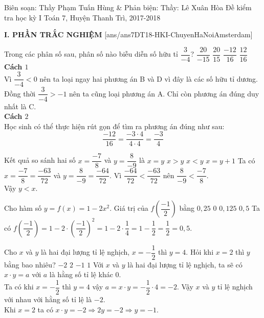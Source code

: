 	\begin{name}
		{Biên soạn: Thầy Phạm Tuấn Hùng \& Phản biện: Thầy: Lê Xuân Hòa}
		{Đề kiểm tra học kỳ I Toán 7, Huyện Thanh Trì, 2017-2018}
	\end{name}
	\noindent\textbf{I. PHẦN TRẮC NGHIỆM}
	\setcounter{ex}{0}
	[ans/ans7DT18-HKI-ChuyenHaNoiAmsterdam]
			\begin{ex}%
				Trong các phân số sau, phân số nào biễu diễn số hữu tỉ $\dfrac{3}{-4}$?
				\choice
				{$\dfrac{20}{-15}$}
				{$\dfrac{20}{15}$}
				{\True $\dfrac{-12}{16}$}
				{$\dfrac{12}{16}$}
				\loigiai
				{
\textbf{Cách $1$}\\
					Vì $\dfrac{3}{-4}<0$ nên ta loại ngay hai phương án B và D vì đây là các số hữu tỉ dương. Đồng thời $\dfrac{3}{-4}>-1$ nên ta cũng loại phương án A. Chỉ còn phương án đúng duy nhất là C.\\
\textbf{Cách $2$}\\
					Học sinh có thể thực hiện rút gọn để tìm ra phương án đúng như sau:\\
					$$\dfrac{-12}{16}=\dfrac{-3\cdot4}{4\cdot 4}=\dfrac{-3}{4}$$
				}
			\end{ex}
			\begin{ex}%
				Kết quả so sánh hai số $x=\dfrac{-7}{8}$ và $y=\dfrac{8}{-9}$ là
				\choice
				{$x=y$}
				{\True $x>y$}
				{$x<y$}
				{$x=y+1$}
				\loigiai
				{
					Ta có $x=\dfrac{-7}{8}=\dfrac{-63}{72}$ và $y=\dfrac{8}{-9}=\dfrac{-64}{72}$. Vì $\dfrac{-64}{72}<\dfrac{-63}{72}$ nên $ \dfrac{8}{-9} <\dfrac{-7}{8}$.\\
					Vậy $y<x$.
				}
			\end{ex}
			\begin{ex}%
				Cho hàm số $y=f(x)=1-2x^2$. Giá trị của $f\left(\dfrac{-1}{2} \right) $ bằng
				\choice
				{$0{,}25$}
				{$0$}
				{$0{,}125$}
				{$0{,}5$}
				\loigiai
				{
					Ta có $f\left(\dfrac{-1}{2} \right)=1-2\cdot \left( \dfrac{-1}{2}\right)^2=1-2\cdot \dfrac{1}{4}=1-\dfrac{1}{2}=\dfrac{1}{2}=0{,}5$.
				}
			\end{ex}
			\begin{ex}%
				Cho $x$ và $y$ là hai đại lượng tỉ lệ nghịch, $x=-\dfrac{1}{2}$ thì $y=4$. Hỏi khi $x=2$ thì $y$ bằng bao nhiêu?
				\choice
				{$-2$}
				{$2$}
				{$-1$}
				{$1$}
				\loigiai
				{
					Với $x$ và $y$ là hai đại lượng tỉ lệ nghịch, ta sẽ có $x\cdot y=a$ với $a$ là hằng số tỉ lệ khác $0$.\\
					Ta có khi $x=-\dfrac{1}{2}$ thì $y=4$ vậy $a=x\cdot y=-\dfrac{1}{2}\cdot 4=-2$. Vậy $x$ và $y$ tỉ lệ nghịch với nhau với hằng số tỉ lệ là $-2$.\\
					Khi $x=2$ ta có $x\cdot y=-2 \Rightarrow 2y=-2 \Rightarrow y=-1$.
				}
			\end{ex}
